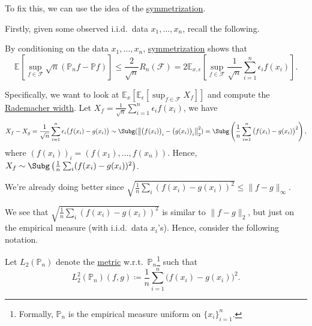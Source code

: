 \begin{intuition}
	To fix this, we can use the idea of the \hyperref[lma:symmetrization]{symmetrization}.
\end{intuition}

Firstly, given some observed i.i.d.\ data \(x_1, \dots , x_n\), recall the following.

\begin{prev}
	By conditioning on the data \(x_1, \dots , x_n\), \hyperref[lma:symmetrization]{symmetrization} shows that
	\[
		\mathbb{E}_{}\left[\sup _{f\in \mathscr{F} } \sqrt{n} (\mathbb{P} _n f - \mathbb{P} f) \right]
		\leq \frac{2}{\sqrt{n} }R_n(\mathscr{\mathscr{F} } )
		= 2\mathbb{E}_{x, \epsilon }\left[ \sup _{f\in \mathscr{F} } \frac{1}{\sqrt{n} }\sum_{i=1}^{n} \epsilon _i f(x_i) \right] .
	\]
\end{prev}

Specifically, we want to look at \(\mathbb{E}_{x}\left[\mathbb{E}_{\epsilon }\left[ \sup _{f\in \mathscr{F} } X_f \right] \right]\) and compute the \hyperref[def:Rademacher-width]{Rademacher width}. Let \(X_f = \frac{1}{\sqrt{n} } \sum_{i=1}^{n} \epsilon _i f(x_i)\), we have
\[
	X_f - X_g
	= \frac{1}{\sqrt{n} } \sum_{i=1}^{n} \epsilon _i \big(f(x_i) - g(x_i)\big)
	\sim \Subg(\left\lVert \big(f(x_i)\big)_i - \big(g(x_i)\big)_i \right\rVert _2^2)
	= \Subg\left( \frac{1}{n}\sum_{i=1}^{n} \big(f(x_i) - g(x_i)\big)^2 \right) ,
\]
where \((f(x_i))_i = (f(x_1), \dots , f(x_n))\). Hence, \(X_f \sim \Subg\left( \frac{1}{n}\sum_{i} (f(x_i) - g(x_i))^2 \right) \).

\begin{note}
	We're already doing better since \(\sqrt{\frac{1}{n}\sum_{i} (f(x_i) - g(x_i))^2} \leq \lVert f - g \rVert _\infty \).
\end{note}

We see that \(\sqrt{\frac{1}{n}\sum_{i} (f(x_i) - g(x_i))^2}\) is similar to \(\lVert f - g \rVert _2\), but just on the empirical measure (with i.i.d.\ data \(x_i\)'s). Hence, consider the following notation.

\begin{notation}
	Let \(L_2(\mathbb{P} _n)\) denote the \hyperref[def:pseudo-metric]{metric} w.r.t.\ \(\mathbb{P} _n\)\footnote{Formally, \(\mathbb{P} _n\) is the empirical measure uniform on \(\{ x_i \} _{i=1}^n\).} such that
	\[
		L_2^2(\mathbb{P} _n) (f, g) \coloneqq \frac{1}{n}\sum_{i=1}^{n} \big(f(x_i) - g(x_i)\big)^2.
	\]
\end{notation}

